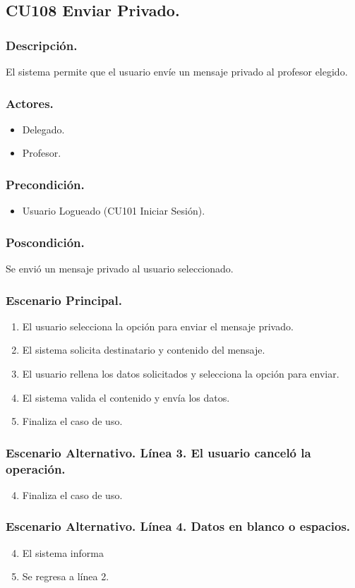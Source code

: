 \subsection{CU108 Enviar Privado.}
\subsubsection{Descripci\'{o}n.}
El sistema permite que el usuario env\'{i}e un mensaje privado al profesor elegido.
\subsubsection{Actores.}
\begin{itemize}
\item Delegado.
\item Profesor.
\end{itemize}
\subsubsection{Precondici\'{o}n.}
\begin{itemize}
\item Usuario Logueado (CU101 Iniciar Sesi\'{o}n).
\end{itemize}
\subsubsection{Poscondici\'{o}n.}
Se envi\'{o} un mensaje privado al usuario seleccionado.
\subsubsection{Escenario Principal.}
\begin{enumerate}
\item El usuario selecciona la opci\'{o}n para enviar el mensaje privado.
\item El sistema solicita destinatario y contenido del mensaje.
\item El usuario rellena los datos solicitados y selecciona la opci\'{o}n para enviar.
\item El sistema valida el contenido y env\'{i}a los datos.
\item Finaliza el caso de uso.
\end{enumerate}

\subsubsection{Escenario Alternativo. L\'{i}nea 3. El usuario cancel\'{o} la operaci\'{o}n.}
\begin{enumerate}
\setcounter{enumi}{3}
\item Finaliza el caso de uso.
\end{enumerate}

\subsubsection{Escenario Alternativo. L\'{i}nea 4. Datos en blanco o espacios.}
\begin{enumerate}
\setcounter{enumi}{3}
\item El sistema informa
\item Se regresa a l\'{i}nea 2.
\end{enumerate}
